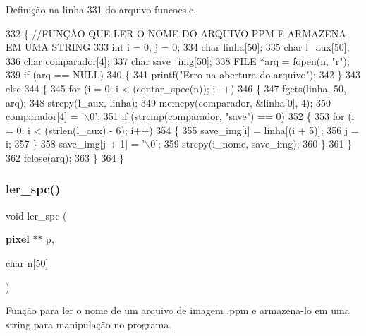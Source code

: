 Definição na linha 331 do arquivo funcoes.\+c.


\begin{DoxyCode}
332 \{ \textcolor{comment}{//FUNÇÃO QUE LER O NOME DO ARQUIVO PPM E ARMAZENA EM UMA STRING}
333     \textcolor{keywordtype}{int} i = 0, j = 0;
334     \textcolor{keywordtype}{char} linha[50];
335     \textcolor{keywordtype}{char} l\_aux[50];
336     \textcolor{keywordtype}{char} comparador[4];
337     \textcolor{keywordtype}{char} save\_img[50];
338     FILE *arq = fopen(n, \textcolor{stringliteral}{"r"});
339     \textcolor{keywordflow}{if} (arq == NULL)
340     \{
341         printf(\textcolor{stringliteral}{"Erro na abertura do arquivo"});
342     \}
343     \textcolor{keywordflow}{else}
344     \{
345         \textcolor{keywordflow}{for} (i = 0; i < (contar_spec(n)); i++)
346         \{
347             fgets(linha, 50, arq);
348             strcpy(l\_aux, linha);
349             memcpy(comparador, &linha[0], 4);
350             comparador[4] = \textcolor{charliteral}{'\(\backslash\)0'};
351             \textcolor{keywordflow}{if} (strcmp(comparador, \textcolor{stringliteral}{"save"}) == 0)
352             \{
353                 \textcolor{keywordflow}{for} (i = 0; i < (strlen(l\_aux) - 6); i++)
354                 \{
355                     save\_img[i] = linha[(i + 5)];
356                     j = i;
357                 \}
358                 save\_img[j + 1] = \textcolor{charliteral}{'\(\backslash\)0'};
359                 strcpy(i\_nome, save\_img);
360             \}
361         \}
362         fclose(arq);
363     \}
364 \}
\end{DoxyCode}
\mbox{\label{funcoes_8h_ab13215ddb866fcdf16ecefbabffaf0a5}} 
\subsubsection{ler\+\_\+spc()}
{\footnotesize\ttfamily void ler\+\_\+spc (\begin{DoxyParamCaption}\item[{\textbf{ pixel} $\ast$$\ast$}]{p,  }\item[{char}]{n[50] }\end{DoxyParamCaption})}



Função para ler o nome de um arquivo de imagem .ppm e armazena-\/lo em uma string para manipulação no programa. 



